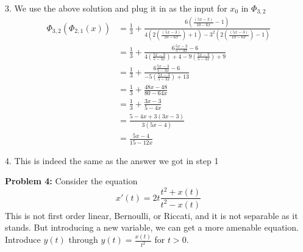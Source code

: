 \documentclass[12pt]{article}
\begin{document}
\begin{enumerate}
          3. We use the above solution and plug it in as the input for $x_0$ in $\Phi_{3,2}$
          \begin{align*}
              \Phi{}_{3,2}(\Phi{}_{2,1}(x)) & =  \frac{1}{3} + \frac{6(\frac{(5x-3)}{10-6x} - 1)}{4(2(\frac{(5x-3)}{10-6x})+1)-3^{2}(2(\frac{(5x-3)}{10-6x}) - 1)} \\
                                            & =  \frac{1}{3} + \frac{6\frac{5x-3}{5-3x} - 6}{4(\frac{5x-3}{5-3x})+4-9(\frac{5x-3}{5-3x}) + 9}                      \\
                                            & =  \frac{1}{3} + \frac{6\frac{5x-3}{5-3x} - 6}{-5(\frac{5x-3}{5-3x}) +13}                                            \\
                                            & =  \frac{1}{3} + \frac{48x-48}{80-64x}                                                                               \\
                                            & = \frac{1}{3} + \frac{3x-3}{5-4x}                                                                                    \\
                                            & = \frac{5-4x+3(3x-3)}{3(5x-4)}                                                                                       \\
                                            & = \frac{5x-4}{15-12x}
          \end{align*}

          4. This is indeed the same as the answer we got in step 1
\end{enumerate}

\newpage

\noindent \textbf{Problem 4:} Consider the equation
\begin{equation}
    x'(t) = 2t \frac{t^2 + x(t)}{t^2 - x(t)} \tag{1}
\end{equation}
This is not first order linear, Bernoulli, or Riccati, and it is not separable as it stands. But introducing a new variable, we can get a more amenable equation. Introduce $y(t)$ through $y(t) = \frac{x(t)}{t^2}$ for $t > 0$.
\end{document}
